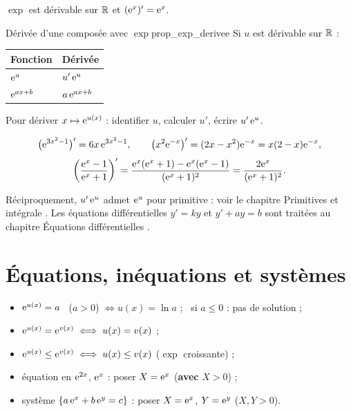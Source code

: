 \begin{theoreme}
	$\exp$ est dérivable sur $\mathbb{R}$ et $(\mathrm{e}^{x})'=\mathrm{e}^{x}$.
\end{theoreme}

\begin{propriete}{Dérivée d'une composée avec $\exp$}{prop_exp_derivee}
	Si $u$ est dérivable sur $\mathbb{R}$ :
	\begin{center}
	\renewcommand{\arraystretch}{2.0}
	\begin{tabular}{>{\centering\arraybackslash}p{3.0cm}
	                >{\centering\arraybackslash}p{3.0cm}}
	\hline
	Fonction & Dérivée \\
	\hline
	$\mathrm{e}^{u}$        & $u'\,\mathrm{e}^{u}$ \\
	$\mathrm{e}^{ax+b}$     & $a\,\mathrm{e}^{ax+b}$ \\
	\hline
	\end{tabular}
	\end{center}
\end{propriete}

\begin{methode}
	Pour dériver $x\mapsto\mathrm{e}^{u(x)}$ : identifier $u$, calculer $u'$, écrire
	$u'\,\mathrm{e}^{u}$.
\end{methode}

\begin{exemple}
	\[
	\bigl(\mathrm{e}^{3x^{2}-1}\bigr)'=6x\,\mathrm{e}^{3x^{2}-1},
	\qquad
	\bigl(x^{2}\mathrm{e}^{-x}\bigr)'=(2x-x^{2})\mathrm{e}^{-x}=x(2-x)\mathrm{e}^{-x},
	\]
	\[
	\left(\frac{\mathrm{e}^{x}-1}{\mathrm{e}^{x}+1}\right)'
	=\frac{\mathrm{e}^{x}(\mathrm{e}^{x}+1)-\mathrm{e}^{x}(\mathrm{e}^{x}-1)}{(\mathrm{e}^{x}+1)^{2}}
	=\frac{2\mathrm{e}^{x}}{(\mathrm{e}^{x}+1)^{2}}.
	\]
\end{exemple}

\begin{remarque}
	Réciproquement, $u'\,\mathrm{e}^{u}$ admet $\mathrm{e}^{u}$ pour primitive : voir le
	chapitre \og Primitives et intégrale \fg. Les équations différentielles
	$y'=ky$ et $y'+ay=b$ sont traitées au chapitre \og Équations
	différentielles \fg.
\end{remarque}


\section{Équations, inéquations et systèmes}

\begin{methode}
	\begin{itemize}[label=\textbullet]
		\item $\mathrm{e}^{u(x)}=a$ \ ($a>0$) $\iff u(x)=\ln a$ ; \ si $a\leq 0$ : pas de
		solution ;
		\item $\mathrm{e}^{u(x)}=\mathrm{e}^{v(x)} \iff u(x)=v(x)$ ;
		\item $\mathrm{e}^{u(x)}\leq\mathrm{e}^{v(x)} \iff u(x)\leq v(x)$ ($\exp$ croissante) ;
		\item équation en $\mathrm{e}^{2x}$, $\mathrm{e}^{x}$ : poser $X=\mathrm{e}^{x}$ (\textbf{avec}
		$X>0$) ;
		\item système $\{a\,\mathrm{e}^{x}+b\,\mathrm{e}^{y}=c\}$ : poser $X=\mathrm{e}^{x}$, $Y=\mathrm{e}^{y}$
		($X,Y>0$).
	\end{itemize}
\end{methode}

